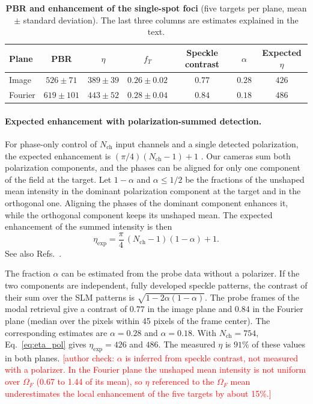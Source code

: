 \documentclass{article}
\newcommand{\note}[1]{\textcolor{red}{[#1]}}
\begin{document}
\begin{table}[h]
\centering
\caption{\textbf{PBR and enhancement of the single-spot foci} (five targets per plane, mean $\pm$ standard deviation). The last three columns are estimates explained in the text.}
\label{tab:pbr}
\begin{tabular}{lcccccc}
\toprule
Plane & PBR & $\eta$ & $f_T$ & Speckle contrast & $\alpha$ & Expected $\eta$ \\
\midrule
Image & $526\pm71$ & $389\pm39$ & $0.26\pm0.02$ & $0.77$ & $0.28$ & $426$ \\
Fourier & $619\pm101$ & $443\pm52$ & $0.28\pm0.04$ & $0.84$ & $0.18$ & $486$ \\
\bottomrule
\end{tabular}
\end{table}

\paragraph{Expected enhancement with polarization-summed detection.}
For phase-only control of $N_{\mathrm{ch}}$ input channels and a single detected polarization, the expected enhancement is $(\pi/4)(N_{\mathrm{ch}}-1)+1$ \cite{focusing_coherent}.
Our cameras sum both polarization components, and the phases can be aligned for only one component of the field at the target.
Let $1-\alpha$ and $\alpha\leq1/2$ be the fractions of the unshaped mean intensity in the dominant polarization component at the target and in the orthogonal one.
Aligning the phases of the dominant component enhances it, while the orthogonal component keeps its unshaped mean.
The expected enhancement of the summed intensity is then
\begin{equation}
\label{eq:eta_pol}
\eta_{\mathrm{exp}}=\frac{\pi}{4}\,(N_{\mathrm{ch}}-1)(1-\alpha)+1.
\end{equation}
See also Refs.~\cite{shen2016,woo2022}.

The fraction $\alpha$ can be estimated from the probe data without a polarizer.
If the two components are independent, fully developed speckle patterns, the contrast of their sum over the SLM patterns is $\sqrt{1-2\alpha(1-\alpha)}$.
The probe frames of the modal retrieval give a contrast of $0.77$ in the image plane and $0.84$ in the Fourier plane (median over the pixels within 45 pixels of the frame center).
The corresponding estimates are $\alpha=0.28$ and $\alpha=0.18$.
With $N_{\mathrm{ch}}=754$, Eq.~\eqref{eq:eta_pol} gives $\eta_{\mathrm{exp}}=426$ and $486$.
The measured $\eta$ is $91\%$ of these values in both planes.
\note{author check: $\alpha$ is inferred from speckle contrast, not measured with a polarizer. In the Fourier plane the unshaped mean intensity is not uniform over $\Omega_F$ (0.67 to 1.44 of its mean), so $\eta$ referenced to the $\Omega_F$ mean underestimates the local enhancement of the five targets by about 15\%.}
\end{document}
